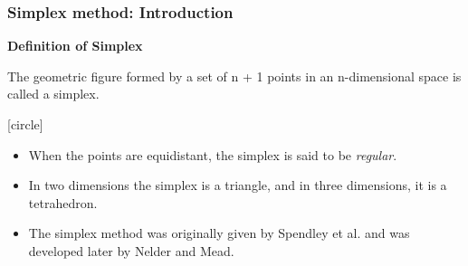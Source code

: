 \documentclass{beamer}
\begin{document}
\begin{frame}
    \frametitle{Simplex method: Introduction}
    \textbf{Definition of Simplex}

    The geometric figure formed by a set of n + 1 points in an
    n-dimensional space is called a simplex.

    [circle]
    \begin{itemize}
        \item When the points are equidistant, the simplex is said to be \textit{regular}.
        \item In two dimensions the simplex is a triangle, and in three dimensions, it is a tetrahedron.
        \item The simplex method was originally given by Spendley et al. and was developed later by Nelder and Mead.
    \end{itemize}    
\end{frame}
\end{document}
